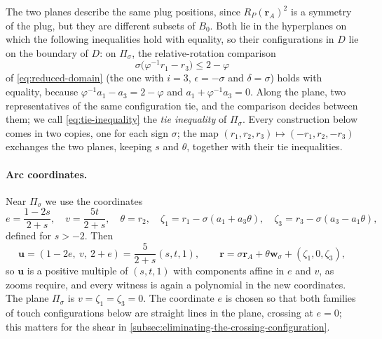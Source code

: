 The two planes describe the same plug positions, since
$R_P(\mathbf r_A)^2$ is a symmetry of the plug, but they are different
subsets of $B_0$. Both lie in the hyperplanes on which the following
inequalities hold with equality, so their configurations in $D$ lie on the
boundary of $D$: on $\Pi_\sigma$, the
relative-rotation comparison
\begin{equation}\label{eq:tie-inequality}
  \sigma\bigl(\varphi^{-1}r_1-r_3\bigr)\le2-\varphi
\end{equation}
of \cref{eq:reduced-domain} (the one with $i=3$, $\epsilon=-\sigma$ and
$\delta=\sigma$) holds with equality, because
$\varphi^{-1}a_1-a_3=2-\varphi$ and $a_1+\varphi^{-1}a_3=0$. Along the plane,
two representatives of the same configuration tie, and the comparison
decides between them; we call \cref{eq:tie-inequality} the \emph{tie
inequality} of $\Pi_\sigma$. Every construction below comes in two copies,
one for each sign $\sigma$; the map $(r_1,r_2,r_3)\mapsto(-r_1,r_2,-r_3)$
exchanges the two planes, keeping $s$ and $\theta$, together with their tie
inequalities.

\paragraph{Arc coordinates.}
Near $\Pi_\sigma$ we use the coordinates
\begin{equation}\label{eq:arc-coordinates}
  e=\frac{1-2s}{2+s},\quad v=\frac{5t}{2+s},\quad \theta=r_2,\quad
  \zeta_1=r_1-\sigma(a_1+a_3\theta),\quad
  \zeta_3=r_3-\sigma(a_3-a_1\theta),
\end{equation}
defined for $s>-2$. Then
\[
  \mathbf u=(1-2e,\ v,\ 2+e)=\frac5{2+s}(s,t,1),\qquad
  \mathbf r=\sigma\mathbf r_A+\theta\mathbf w_\sigma+(\zeta_1,0,\zeta_3),
\]
so $\mathbf u$ is a positive multiple of $(s,t,1)$ with components affine
in $e$ and $v$, as zooms require, and every witness is again a polynomial
in the new coordinates. The plane $\Pi_\sigma$ is $v=\zeta_1=\zeta_3=0$. The
coordinate $e$ is chosen so that both families of touch configurations
below are straight lines in the plane, crossing at $e=0$; this matters for
the shear in \cref{subsec:eliminating-the-crossing-configuration}.

